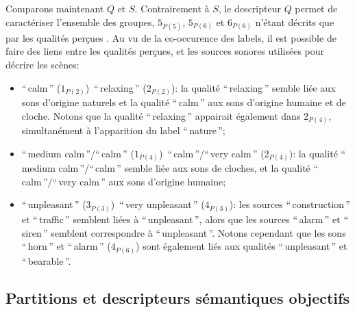 Comparons maintenant $Q$ et $S$. Contrairement à $S$, le descripteur $Q$ permet de caractériser l'ensemble des groupes,  $5_{P(5)}$,  $5_{P(6)}$ et  $6_{P(6)}$ n'étant décrits que par les qualités perçues . Au vu de la co-occurence des labels, il est possible de faire des liens entre les qualités perçues, et les sources sonores utilisées pour décrire les scènes:

\begin{itemize}
\item ``\,calm\,'' ($1_{P(2)}$)~\vs ``\,relaxing\,'' ($2_{P(2)}$): la qualité ``\,relaxing\,'' semble liée aux sons d'origine naturels et la qualité ``\,calm\,'' aux sons d'origine humaine et de cloche. Notons que la qualité ``\,relaxing\,'' appairait également dans $2_{P(4)}$, simultanément à l'apparition du label ``\,nature\,'';
\item ``\,medium calm\,''/``\,calm\,'' ($1_{P(4)}$)~\vs ``\,calm\,''/``\,very calm\,'' ($2_{P(4)}$): la qualité ``\,medium calm\,''/``\,calm\,'' semble liée aux sons de cloches, et la qualité ``\,calm\,''/``\,very calm\,'' aux sons d'origine humaine;
\item ``\,unpleasant\,'' ($3_{P(3)}$)~\vs ``\,very unpleasant\,'' ($4_{P(3)}$): les sources ``\,construction\,'' et ``\,traffic\,'' semblent liées à ``\,unpleasant\,'', alors que les sources ``\,alarm\,'' et ``\,siren\,'' semblent correspondre à ``\,unpleasant\,''. Notons cependant que les sons ``\,horn\,'' et ``\,alarm\,'' ($4_{P(6)}$) sont également liés aux qualités ``\,unpleasant\,'' et ``\,bearable\,''.
\end{itemize}

\subsection{Partitions et descripteurs sémantiques objectifs}

